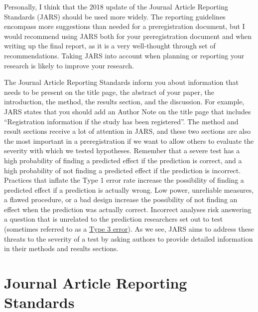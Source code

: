\documentclass[
  oneside]{krantz}
\begin{document}
Personally, I think that the 2018 update of the Journal Article Reporting Standards (JARS) \citep{appelbaum_journal_2018} should be used more widely. The reporting guidelines encompass more suggestions than needed for a preregistration document, but I would recommend using JARS both for your preregistration document and when writing up the final report, as it is a very well-thought through set of recommendations. Taking JARS into account when planning or reporting your research is likely to improve your research.

The Journal Article Reporting Standards inform you about information that needs to be present on the title page, the abstract of your paper, the introduction, the method, the results section, and the discussion. For example, JARS states that you should add an Author Note on the title page that includes ``Registration information if the study has been registered''. The method and result sections receive a lot of attention in JARS, and these two sections are also the most important in a preregistration if we want to allow others to evaluate the severity with which we tested hypotheses. Remember that a severe test has a high probability of finding a predicted effect if the prediction is correct, and a high probability of not finding a predicted effect if the prediction is incorrect. Practices that inflate the Type 1 error rate increase the possibility of finding a predicted effect if a prediction is actually wrong. Low power, unreliable measures, a flawed procedure, or a bad design increase the possibility of not finding an effect when the prediction was actually correct. Incorrect analyses risk answering a question that is unrelated to the prediction researchers set out to test (sometimes referred to as a \href{https://en.wikipedia.org/wiki/Type_III_error\#Kimball}{Type 3 error}). As we see, JARS aims to address these threats to the severity of a test by asking authors to provide detailed information in their methods and results sections.

\hypertarget{journal-article-reporting-standards}{%
\section{Journal Article Reporting Standards}\label{journal-article-reporting-standards}}
\end{document}
